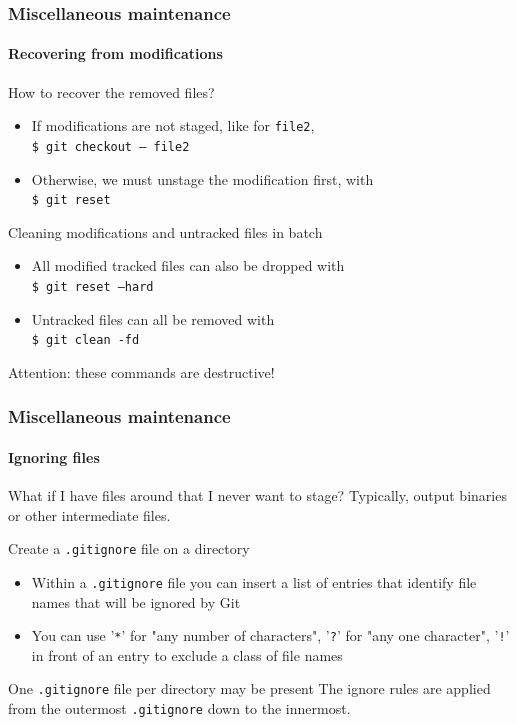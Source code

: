 \begin{frame}
\frametitle{Miscellaneous maintenance}
\framesubtitle{Recovering from modifications}

\begin{block}{How to recover the removed files?}
\begin{itemize}
\item If modifications are not staged, like for \texttt{file2}, \\
\texttt{\$ git checkout --- file2}
\item Otherwise, we must unstage the modification first, with \\
\texttt{\$ git reset}
\end{itemize}
\end{block}

\pause
\begin{block}{Cleaning modifications and untracked files in batch}
\begin{itemize}
\item All modified tracked files can also be dropped with \\
\texttt{\$ git reset ---hard}
\item Untracked files can all be removed with \\
\texttt{\$ git clean -fd}
\end{itemize}
Attention: these commands are destructive!
\end{block}

\end{frame}

\begin{frame}
\frametitle{Miscellaneous maintenance}
\framesubtitle{Ignoring files}

\begin{block}{What if I have files around that I never want to stage?}
Typically, output binaries or other intermediate files.
\end{block}
\pause
\begin{block}{Create a \texttt{.gitignore} file on a directory}
\begin{itemize}
\item Within a \texttt{.gitignore} file you can insert a list of entries that identify file names that will be ignored by Git
\item You can use '\texttt{*}' for "any number of characters", '\texttt{?}' for "any one character", '\texttt{!}' in front of an entry to exclude a class of file names
\end{itemize}
\end{block}
\pause
\begin{block}{One \texttt{.gitignore} file per directory may be present}
The ignore rules are applied from the outermost \texttt{.gitignore} down to the innermost.
\end{block}

\end{frame}

